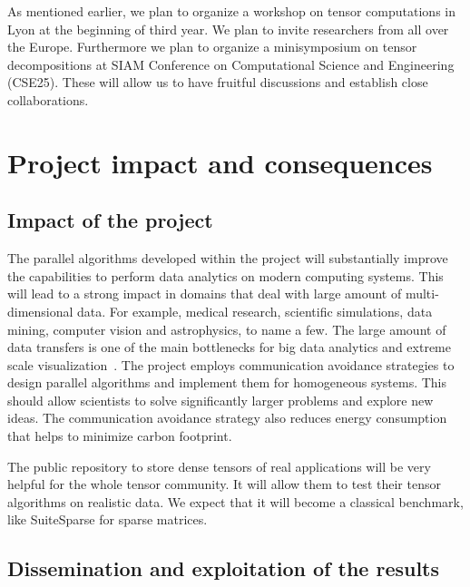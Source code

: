 \documentclass[a4paper,11pt]{article}
\begin{document}
	As mentioned earlier, we plan to organize a workshop on tensor computations in Lyon at the beginning of third year. We plan to invite researchers from all over the Europe. Furthermore we plan to organize a minisymposium on tensor decompositions at SIAM Conference on Computational Science and Engineering (CSE25). These will allow us to have fruitful discussions and establish close collaborations.
	
	
	

	\section{Project impact and consequences}
	\label{sec:impact}
	\subsection*{Impact of the project}
	The parallel algorithms developed within the project will substantially improve the capabilities to perform data analytics on modern computing systems. This will lead to a strong impact in domains that deal with large amount of multi-dimensional data. For example, medical research, scientific simulations, data mining, computer vision and astrophysics, to name a few. The large amount of data transfers is one of the main bottlenecks for big data analytics and extreme scale visualization~\cite{DOE-Report-2014}. The project employs communication avoidance strategies to design parallel algorithms and implement them for homogeneous systems. This should allow scientists to solve significantly larger problems and explore new ideas. The communication avoidance strategy also reduces energy consumption that helps to minimize carbon footprint.
	
	The public repository to store dense tensors of real applications will be very helpful for the whole tensor community. It will allow them to test their tensor algorithms on realistic data. We expect that it will become a classical benchmark, like SuiteSparse for sparse matrices.
	
	
	
	\subsection*{Dissemination and exploitation of the results}
	
\end{document}
